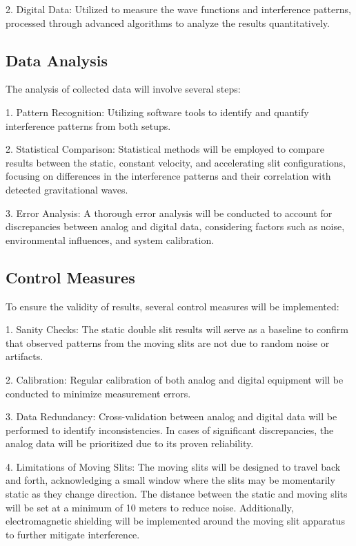 \documentclass{article}
\begin{document}
2. Digital Data: Utilized to measure the wave functions and interference patterns, processed through advanced algorithms to analyze the results quantitatively.

\subsection{Data Analysis}
The analysis of collected data will involve several steps:

1. Pattern Recognition: Utilizing software tools to identify and quantify interference patterns from both setups.

2. Statistical Comparison: Statistical methods will be employed to compare results between the static, constant velocity, and accelerating slit configurations, focusing on differences in the interference patterns and their correlation with detected gravitational waves.

3. Error Analysis: A thorough error analysis will be conducted to account for discrepancies between analog and digital data, considering factors such as noise, environmental influences, and system calibration.

\subsection{Control Measures}
To ensure the validity of results, several control measures will be implemented:

1. Sanity Checks: The static double slit results will serve as a baseline to confirm that observed patterns from the moving slits are not due to random noise or artifacts.

2. Calibration: Regular calibration of both analog and digital equipment will be conducted to minimize measurement errors.

3. Data Redundancy: Cross-validation between analog and digital data will be performed to identify inconsistencies. In cases of significant discrepancies, the analog data will be prioritized due to its proven reliability.

4. Limitations of Moving Slits: The moving slits will be designed to travel back and forth, acknowledging a small window where the slits may be momentarily static as they change direction. The distance between the static and moving slits will be set at a minimum of 10 meters to reduce noise. Additionally, electromagnetic shielding will be implemented around the moving slit apparatus to further mitigate interference.
\end{document}
